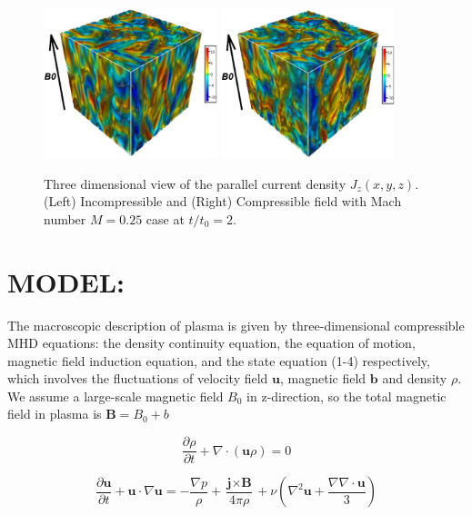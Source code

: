 \documentclass[%
aip,pop,amsmath,amssymb,
 reprint,%
]{revtex4-1}
\begin{document}
\begin{figure}[<t>]
\begin{center}
{\includegraphics[width = 0.45\textwidth]{./Figures/Fig1_a}}
{\includegraphics[width = 0.45\textwidth]{./Figures/Fig1_b}}
\caption{Three dimensional view of the parallel current density $J_z(x,y,z)$. (Left) Incompressible and 
(Right) Compressible field with Mach number $M=0.25$ case at $t/t_0 =2$.}
\end{center}
\end{figure}


\section{\label{sec:level2}MODEL:}
The macroscopic description of plasma is given by three-dimensional compressible MHD equations: the density continuity equation, the equation of motion, magnetic field induction equation, and the state equation (1-4) respectively, which involves the fluctuations  of velocity field $\textbf{u}$, magnetic field $\textbf{b}$ and density $\rho$. We assume a large-scale magnetic field $B_0$ in z-direction, so the total magnetic field in plasma is $\textbf{B} = B_0 + b$

\begin{equation}
 \frac{\partial \rho}{\partial t} + \nabla \cdot (\textbf{u}\rho) = 0
\end{equation}

\begin{equation}
 \frac{\partial \textbf{u}}{\partial t} + \textbf{u} \cdot \nabla \textbf{u} = - \frac{\nabla p}{\rho} + \frac{\textbf{j} \times \textbf{B}}{4\pi\rho} 
 + \nu \left( \nabla^2 \textbf{u} +    \frac{\nabla \nabla \cdot \textbf{u} }{3} \right)
\end{equation}
\end{document}
